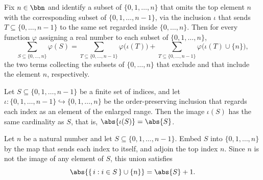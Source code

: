 \begin{lemma}
\leanok
{}
\label{BooleanAnalysis.Hypercontractivity.finset_fin_succ_sum_partition}
Fix $n \in \bbn$ and identify a subset of $\{0, 1, \dots, n\}$ that omits the top
element $n$ with the corresponding subset of $\{0, 1, \dots, n-1\}$, via the inclusion
$\iota$ that sends $T \subseteq \{0,\dots,n-1\}$ to the same set regarded inside
$\{0,\dots,n\}$. Then for every function $\varphi$ assigning a real number to each
subset of $\{0, 1, \dots, n\}$,
\[
  \sum_{S \subseteq \{0,\dots,n\}} \varphi(S)
  = \sum_{T \subseteq \{0,\dots,n-1\}} \varphi\bigl(\iota(T)\bigr)
  + \sum_{T \subseteq \{0,\dots,n-1\}} \varphi\bigl(\iota(T) \cup \{n\}\bigr),
\]
the two terms collecting the subsets of $\{0,\dots,n\}$ that exclude and that include
the element $n$, respectively.
\end{lemma}

\begin{lemma}
\leanok
{}
\label{BooleanAnalysis.Hypercontractivity.card_image_castSucc}
Let $S \subseteq \{0, 1, \dots, n-1\}$ be a finite set of indices, and let $\iota \colon
\{0, 1, \dots, n-1\} \hookrightarrow \{0, 1, \dots, n\}$ be the order-preserving
inclusion that regards each index as an element of the enlarged range. Then the image
$\iota(S)$ has the same cardinality as $S$, that is, $\abs{\iota(S)} = \abs{S}$.
\end{lemma}

\begin{lemma}
\leanok
{}
\label{BooleanAnalysis.Hypercontractivity.card_image_castSucc_union_last}
Let $n$ be a natural number and let $S \subseteq \{0, 1, \dots, n-1\}$. Embed $S$ into
$\{0, 1, \dots, n\}$ by the map that sends each index to itself, and adjoin the top
index $n$. Since $n$ is not the image of any element of $S$, this union satisfies
\[
\abs{\{\, i : i \in S \,\} \cup \{n\}} = \abs{S} + 1.
\]
\end{lemma}

